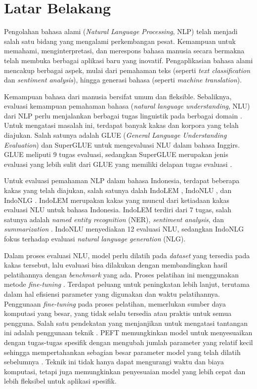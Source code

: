 \section{Latar Belakang}
\label{sec:latar-belakang}

Pengolahan bahasa alami (\textit{Natural Language Processing}, NLP) telah menjadi salah satu bidang yang mengalami perkembangan pesat. Kemampuan untuk memahami, menginterpretasi, dan merespons bahasa manusia secara bermakna telah membuka berbagai aplikasi baru yang inovatif. Pengaplikasian bahasa alami mencakup berbagai aspek, mulai dari pemahaman teks (seperti \textit{text classification} dan \textit{sentiment analysis}), hingga generasi bahasa (seperti \textit{machine translation}).

Kemampuan bahasa dari manusia bersifat umum dan fleksible. Sebaliknya, evaluasi kemampuan pemahaman bahasa (\textit{natural language understanding}, NLU) dari NLP perlu menjalankan berbagai tugas linguistik pada berbagai domain \parencite{glue}. Untuk mengatasi masalah ini, terdapat banyak kakas dan korpora yang telah diajukan. Salah satunya adalah GLUE (\textit{General Language Understanding Evaluation}) \parencite{glue} dan SuperGLUE \parencite{superglue} untuk mengevaluasi NLU dalam bahasa Inggirs. GLUE meliputi 9 tugas evaluasi, sedangkan SuperGLUE merupakan jenis evaluasi yang lebih sulit dari GLUE yang memiliki delapan tugas evaluasi \parencite{indolem}.

Untuk evaluasi pemahaman NLP dalam bahasa Indonesia, terdapat beberapa kakas yang telah diajukan, salah satunya dalah IndoLEM \parencite{indolem}, IndoNLU \parencite{indonlu}, dan IndoNLG \parencite{indonlg}. IndoLEM merupakan kakas yang muncul dari ketiadaan kakas evaluasi NLU untuk bahasa Indonesia. IndoLEM terdiri dari 7 tugas, salah satunya adalah \textit{named entity recognition} (NER), \textit{sentiment analysis}, dan \textit{summarization} \parencite{indolem}. IndoNLU menyediakan 12 evaluasi NLU, sedangkan IndoNLG fokus terhadap evaluasi \textit{natural language generation} (NLG).

Dalam proses evaluasi NLU, model perlu dilatih pada \textit{dataset} yang tersedia pada kakas tersebut, lalu evaluasi bisa dilakukan dengan membandingkan hasil pelatihannya dengan \textit{benchmark} yang ada. Proses pelatihan ini menggunakan metode \textit{fine-tuning} \parencite{indolem}. Terdapat peluang untuk peningkatan lebih lanjut, terutama dalam hal efisiensi parameter yang digunakan dan waktu pelatihannya. Penggunaan \textit{fine-tuning} pada proses pelatihan, memerlukan sumber daya komputasi yang besar, yang tidak selalu tersedia atau praktis untuk semua pengguna. Salah satu pendekatan yang menjanjikan untuk mengatasi tantangan ini adalah penggunaan teknik \PEFT. PEFT memungkinkan model untuk menyesuaikan dengan tugas-tugas spesifik dengan mengubah jumlah parameter yang relatif kecil sehingga mempertahankan sebagian besar parameter model yang telah dilatih sebelumnya \parencite{adapter}. Teknik ini tidak hanya dapat mengurangi waktu dan biaya komputasi, tetapi juga memungkinkan penyesuaian model yang lebih cepat dan lebih fleksibel untuk aplikasi spesifik. 

